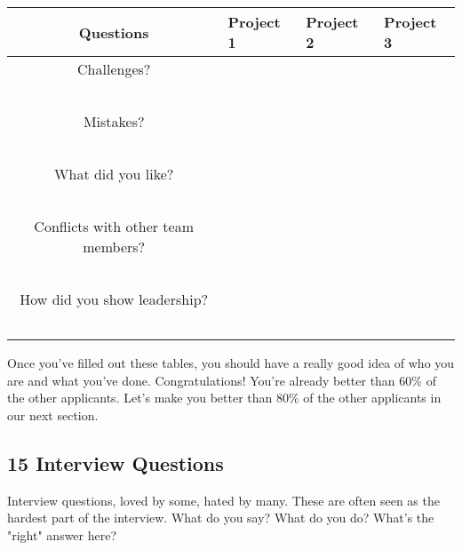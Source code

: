 \documentclass{article}
\begin{document}
\begin{landscape}
 \begin{tabular}{c| m{7cm} m{7cm} m{7cm} } 
 \hline
 Questions & Project 1 & Project 2 & Project 3\\ [0.5ex] 
 \hline\hline
  Challenges?  &  & &  \\ \\\\\\\\\\
 \hline
 Mistakes?&  &  &    \\ \\\\\\\\\\
 \hline
 What did you like?&  &  &  \\ \\\\\\\\\\
 \hline
 Conflicts with other team members?&  & &  \\\\\\\\\\\\
 \hline
 How did you show leadership?&    & &   \\\\\\ \\\\\\[1ex] 
 \hline
\end{tabular}


\end{landscape}
\restoregeometry
\newpage
Once you've filled out these tables, you should have a really good idea
of who you are and what you've done. Congratulations! You're already
better than 60\% of the other applicants. Let's make you better than
80\% of the other applicants in our next section.
\subsection{15 Interview Questions}
Interview questions, loved by some, hated by many. These are often seen
as the hardest part of the interview. What do you say? What do you do?
What's the "right" answer here?
\end{document}
